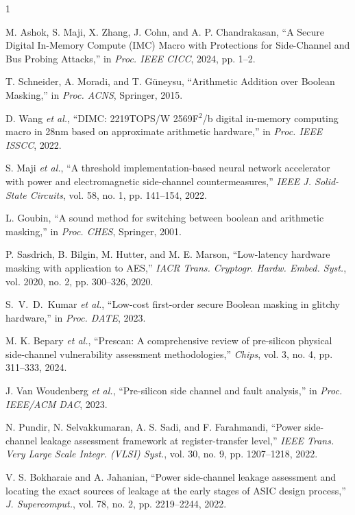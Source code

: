 \documentclass[journal]{IEEEtran}
\begin{document}
%
%
%
\begin{thebibliography}{1}

M. Ashok, S. Maji, X. Zhang, J. Cohn, and A. P. Chandrakasan, ``A Secure Digital In-Memory Compute (IMC) Macro with Protections for Side-Channel and Bus Probing Attacks,'' in \emph{Proc. IEEE CICC}, 2024, pp. 1--2.

T. Schneider, A. Moradi, and T. G\"{u}neysu, ``Arithmetic Addition over Boolean Masking,'' in \emph{Proc. ACNS}, Springer, 2015.

D. Wang \emph{et al.}, ``DIMC: 2219TOPS/W 2569F$^2$/b digital in-memory computing macro in 28nm based on approximate arithmetic hardware,'' in \emph{Proc. IEEE ISSCC}, 2022.

S. Maji \emph{et al.}, ``A threshold implementation-based neural network accelerator with power and electromagnetic side-channel countermeasures,'' \emph{IEEE J. Solid-State Circuits}, vol. 58, no. 1, pp. 141--154, 2022.

L. Goubin, ``A sound method for switching between boolean and arithmetic masking,'' in \emph{Proc. CHES}, Springer, 2001.

P. Sasdrich, B. Bilgin, M. Hutter, and M. E. Marson, ``Low-latency hardware masking with application to AES,'' \emph{IACR Trans. Cryptogr. Hardw. Embed. Syst.}, vol. 2020, no. 2, pp. 300--326, 2020.

S.~V.~D.~Kumar \emph{et al.}, ``Low-cost first-order secure Boolean masking in glitchy hardware,'' in \emph{Proc. DATE}, 2023.

M. K. Bepary \emph{et al.}, ``Prescan: A comprehensive review of pre-silicon physical side-channel vulnerability assessment methodologies,'' \emph{Chips}, vol. 3, no. 4, pp. 311--333, 2024.

J. Van Woudenberg \emph{et al.}, ``Pre-silicon side channel and fault analysis,'' in \emph{Proc. IEEE/ACM DAC}, 2023.

N. Pundir, N. Selvakkumaran, A. S. Sadi, and F. Farahmandi, ``Power side-channel leakage assessment framework at register-transfer level,'' \emph{IEEE Trans. Very Large Scale Integr. (VLSI) Syst.}, vol. 30, no. 9, pp. 1207--1218, 2022.

V. S. Bokharaie and A. Jahanian, ``Power side-channel leakage assessment and locating the exact sources of leakage at the early stages of ASIC design process,'' \emph{J. Supercomput.}, vol. 78, no. 2, pp. 2219--2244, 2022.

\end{thebibliography}
\end{document}
